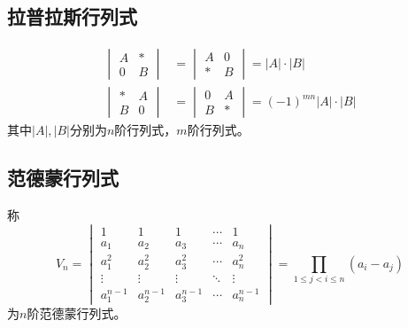 \subsection{拉普拉斯行列式}
\begin{align}
    \label{eq:拉普拉斯行列式}
    \begin{vmatrix}
        A & * \\
        0 & B
    \end{vmatrix}
     & =
    \begin{vmatrix}
        A & 0 \\
        * & B
    \end{vmatrix}
    = |A| \cdot |B|
    \\
    \begin{vmatrix}
        * & A \\
        B & 0
    \end{vmatrix}
     & =
    \begin{vmatrix}
        0 & A \\
        B & *
    \end{vmatrix}
    = (-1)^{mn} |A| \cdot |B|
\end{align}
其中$|A|,|B|$分别为$n$阶行列式，$m$阶行列式。

\subsection{范德蒙行列式}
称
\begin{equation}
    \label{eq:范德蒙行列式}
    V_n =
    \begin{vmatrix}
        1         & 1         & 1         & \cdots & 1         \\
        a_1       & a_2       & a_3       & \cdots & a_n       \\
        a_1^2     & a_2^2     & a_3^2     & \cdots & a_n^2     \\
        \vdots    & \vdots    & \vdots    & \ddots & \vdots    \\
        a_1^{n-1} & a_2^{n-1} & a_3^{n-1} & \cdots & a_n^{n-1}
    \end{vmatrix}
    =
    \prod_{1\leq j < i \leq n} (a_i-a_j)
\end{equation}
为$n$阶范德蒙行列式。

